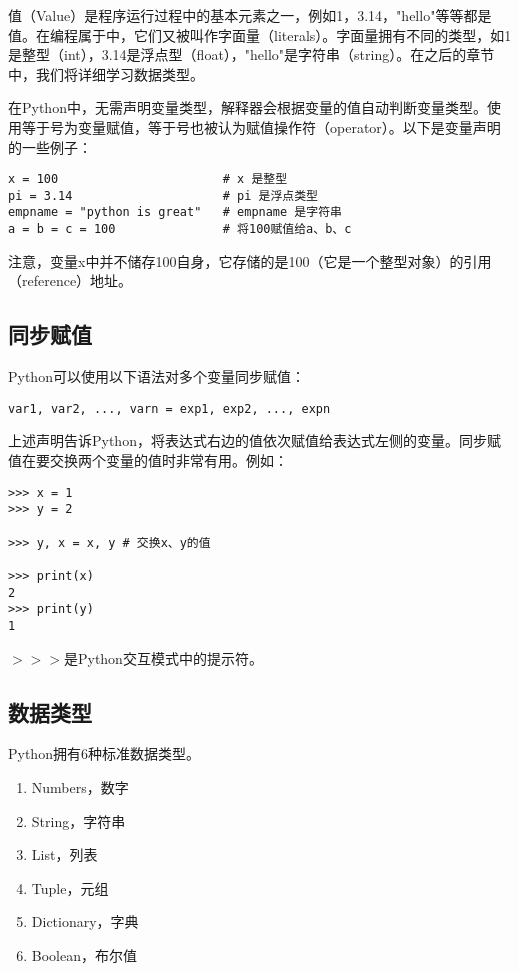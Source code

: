 值（Value）是程序运行过程中的基本元素之一，例如1，3.14，"hello"等等都是值。在编程属于中，它们又被叫作字面量（literals）。字面量拥有不同的类型，如1是整型（int），3.14是浮点型（float），"hello"是字符串（string）。在之后的章节中，我们将详细学习数据类型。

在Python中，无需声明变量类型，解释器会根据变量的值自动判断变量类型。使用等于号为变量赋值，等于号也被认为赋值操作符（operator）。以下是变量声明的一些例子：


\begin{lstlisting}
x = 100                       # x 是整型
pi = 3.14                     # pi 是浮点类型
empname = "python is great"   # empname 是字符串
a = b = c = 100               # 将100赋值给a、b、c
\end{lstlisting}

注意，变量x中并不储存100自身，它存储的是100（它是一个整型对象）的引用（reference）地址。

\subsection{同步赋值}

Python可以使用以下语法对多个变量同步赋值：

\begin{lstlisting}
var1, var2, ..., varn = exp1, exp2, ..., expn
\end{lstlisting}

上述声明告诉Python，将表达式右边的值依次赋值给表达式左侧的变量。同步赋值在要交换两个变量的值时非常有用。例如：

\begin{lstlisting}
>>> x = 1
>>> y = 2

>>> y, x = x, y # 交换x、y的值

>>> print(x)
2
>>> print(y)
1
\end{lstlisting}
\begin{myremark}{}
$>>>$是Python交互模式中的提示符。
\end{myremark}
\subsection{数据类型}
Python拥有6种标准数据类型。
\begin{enumerate}
	\item Numbers，数字
	\item String，字符串
	\item List，列表
	\item Tuple，元组
	\item Dictionary，字典
	\item Boolean，布尔值
\end{enumerate}

